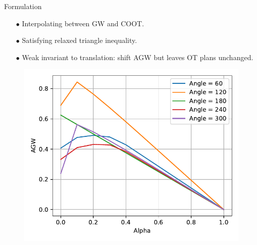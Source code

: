 \documentclass{beamer}
\begin{document}
\begin{frame}{Formulation}
\begin{minipage}[t]{0.55\linewidth}
  \begin{itemize}
    \item[$\bullet$] Interpolating between GW and COOT.
    \item[$\bullet$] Satisfying relaxed triangle inequality.
    \item[$\bullet$] Weak invariant to translation: shift AGW but leaves OT plans unchanged.
  \end{itemize}
  \end{minipage}%
  \hfill%
  \hspace{-6cm}
  \begin{minipage}[t]{0.45\linewidth}
    \vspace{-0.2cm}
  \begin{figure}
    \centering
    \includegraphics[width=1.15\linewidth, keepaspectratio=true]{OT_new/agw_alpha.pdf}
  \end{figure}
  \end{minipage}

\end{frame}
\end{document}
